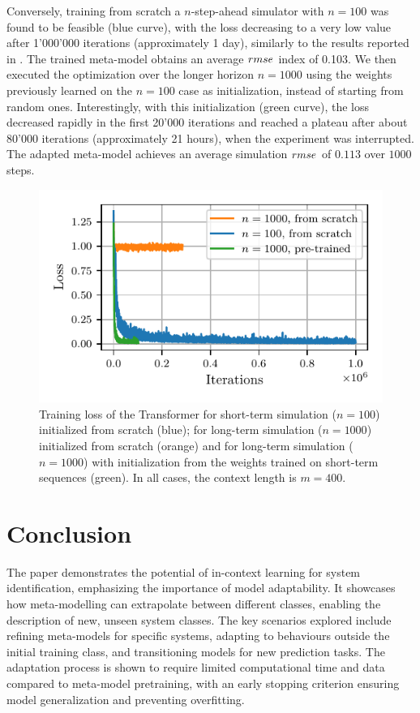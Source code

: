 \documentclass{ifacconf}
\begin{document}
Conversely, training from scratch a $n$-step-ahead simulator with $n=100$ was found to be feasible (blue curve), with 
the loss decreasing to a very low value after 1'000'000 iterations (approximately 1 day), similarly to the results reported in \citet{forgione2023context}. The trained meta-model obtains an average $\rm rmse$ index of 0.103. We then executed the optimization over the longer horizon $n=1000$ using the weights previously learned on the $n=100$ case as initialization, instead of starting from random ones. Interestingly, with this initialization (green curve), the loss decreased rapidly in the first 20'000 iterations and reached a plateau after about 80'000 iterations (approximately 21 hours), when the experiment was interrupted. The adapted meta-model achieves an average simulation $\rm rmse$ of $0.113$ over $1000$ steps.
\begin{figure}
\centering
\includegraphics{img/short_long/wh_pretrain_iterations.pdf}
\caption{Training loss of the Transformer for short-term simulation ($n=100$) initialized from scratch (blue); for long-term simulation ($n=1000$) initialized from scratch (orange) and for long-term simulation ($n=1000$) with initialization from the weights trained on short-term sequences (green). In all cases, the context length is $m=400$.}
\label{fig:training_short_long}
\end{figure}


\section{Conclusion} \label{sec:conc}
The paper demonstrates the potential of in-context learning for system identification, emphasizing the importance of model adaptability. It showcases how meta-modelling can extrapolate between different classes, enabling the description of new, unseen system classes. The key scenarios explored include refining meta-models for specific systems, adapting to behaviours outside the initial training class, and transitioning models for new prediction tasks. The adaptation process is shown to require limited computational time and data compared to meta-model pretraining, with an early stopping criterion ensuring model generalization and preventing overfitting.
\end{document}
